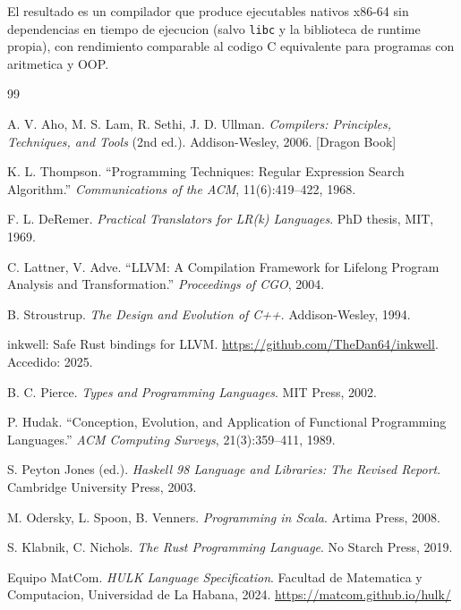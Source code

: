 \documentclass[12pt,a4paper]{article}
\begin{document}
El resultado es un compilador que produce ejecutables nativos x86-64 sin dependencias
en tiempo de ejecucion (salvo \texttt{libc} y la biblioteca de runtime propia), con
rendimiento comparable al codigo C equivalente para programas con aritmetica y OOP.

\begin{thebibliography}{99}

A. V. Aho, M. S. Lam, R. Sethi, J. D. Ullman.
\textit{Compilers: Principles, Techniques, and Tools} (2nd ed.).
Addison-Wesley, 2006. [Dragon Book]

K. L. Thompson.
``Programming Techniques: Regular Expression Search Algorithm.''
\textit{Communications of the ACM}, 11(6):419--422, 1968.

F. L. DeRemer.
\textit{Practical Translators for LR(k) Languages}.
PhD thesis, MIT, 1969.

C. Lattner, V. Adve.
``LLVM: A Compilation Framework for Lifelong Program Analysis and Transformation.''
\textit{Proceedings of CGO}, 2004.

B. Stroustrup.
\textit{The Design and Evolution of C++}.
Addison-Wesley, 1994.

inkwell: Safe Rust bindings for LLVM.
\url{https://github.com/TheDan64/inkwell}. Accedido: 2025.

B. C. Pierce.
\textit{Types and Programming Languages}.
MIT Press, 2002.

P. Hudak.
``Conception, Evolution, and Application of Functional Programming Languages.''
\textit{ACM Computing Surveys}, 21(3):359--411, 1989.

S. Peyton Jones (ed.).
\textit{Haskell 98 Language and Libraries: The Revised Report}.
Cambridge University Press, 2003.

M. Odersky, L. Spoon, B. Venners.
\textit{Programming in Scala}.
Artima Press, 2008.

S. Klabnik, C. Nichols.
\textit{The Rust Programming Language}.
No Starch Press, 2019.

Equipo MatCom.
\textit{HULK Language Specification}.
Facultad de Matematica y Computacion, Universidad de La Habana, 2024.
\url{https://matcom.github.io/hulk/}

\end{thebibliography}
\end{document}
